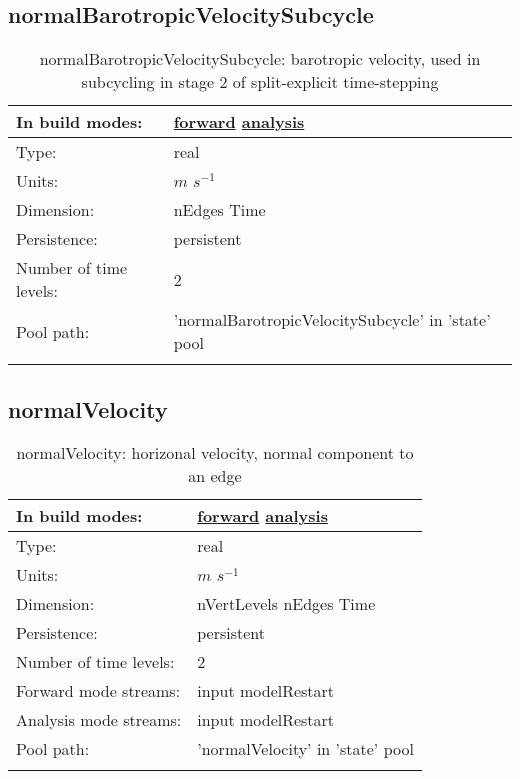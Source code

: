 \subsection[normalBarotropicVelocitySubcycle]{normalBarotropicVelocitySubcycle}
\label{subsec:var_sec_state_normalBarotropicVelocitySubcycle}
\begin{center}
\begin{longtable}{| p{2.0in} | p{4.0in} |}
        \hline 
        In build modes: & \hyperref[subsec:forward_var_tab_state]{forward} \hyperref[subsec:analysis_var_tab_state]{analysis} \\
        \hline 
        Type: & real \\
        \hline 
        Units: & $m$ $s^{-1}$ \\
        \hline 
        Dimension: & nEdges Time \\
        \hline 
        Persistence: & persistent \\
        \hline 
        Number of time levels: & 2 \\
        \hline 
            Pool path: & 'normalBarotropicVelocitySubcycle' in 'state' pool
 \\
		 \hline 
    \caption{normalBarotropicVelocitySubcycle: barotropic velocity, used in subcycling in stage 2 of split-explicit time-stepping}
\end{longtable}
\end{center}
\subsection[normalVelocity]{normalVelocity}
\label{subsec:var_sec_state_normalVelocity}
\begin{center}
\begin{longtable}{| p{2.0in} | p{4.0in} |}
        \hline 
        In build modes: & \hyperref[subsec:forward_var_tab_state]{forward} \hyperref[subsec:analysis_var_tab_state]{analysis} \\
        \hline 
        Type: & real \\
        \hline 
        Units: & $m$ $s^{-1}$ \\
        \hline 
        Dimension: & nVertLevels nEdges Time \\
        \hline 
        Persistence: & persistent \\
        \hline 
        Number of time levels: & 2 \\
        \hline 
		 Forward mode streams: &  input modelRestart \\
        \hline 
		 Analysis mode streams: &  input modelRestart \\
        \hline 
            Pool path: & 'normalVelocity' in 'state' pool
 \\
		 \hline 
    \caption{normalVelocity: horizonal velocity, normal component to an edge}
\end{longtable}
\end{center}
